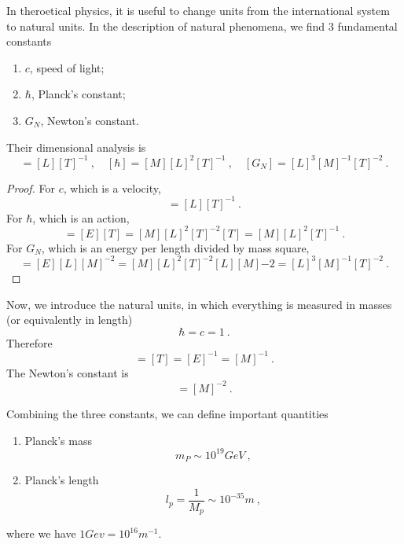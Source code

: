     In theroetical physics, it is useful to change units from the international system to natural units. In the description of natural phenomena, we find $3$ fundamental constants 
    \begin{enumerate}
        \item $c$, speed of light;
        \item $\hbar$, Planck's constant;
        \item $G_N$, Newton's constant.
    \end{enumerate}
    Their dimensional analysis is 
    \begin{equation*}
        [c] = [L][T]^{-1} ~, \quad [\hbar] = [M] [L]^2 [T]^{-1} ~, \quad [G_N] = [L]^3 [M]^{-1} [T]^{-2} ~.
    \end{equation*}
    \begin{proof}
        For $c$, which is a velocity,
        \begin{equation*}
            [c] = [L][T]^{-1} ~.
        \end{equation*}
        For $\hbar$, which is an action,
        \begin{equation*}
            [c] = [E][T] = [M] [L]^2 [T]^{-2} [T] = [M] [L]^2 [T]^{-1}  ~.
        \end{equation*}
        For $G_N$, which is an energy per length divided by mass square,
        \begin{equation*}
            [G_N] = [E] [L] [M]^{-2} = [M] [L]^2 [T]^{-2} [L] [M]{-2} = [L]^3 [M]^{-1} [T]^{-2} ~.
        \end{equation*}
    \end{proof}
    Now, we introduce the natural units, in which everything is measured in masses (or equivalently in length)
    \begin{equation*}
        \hbar = c = 1 ~.
    \end{equation*}
    Therefore 
    \begin{equation*}
        [L] = [T] = [E]^{-1} = [M]^{-1} ~.
    \end{equation*}
    The Newton's constant is 
    \begin{equation*}
        [G] = [M]^{-2} ~.
    \end{equation*}

    Combining the three constants, we can define important quantities
    \begin{enumerate}
        \item Planck's mass \begin{equation*}
            m_P \sim 10^{19} GeV ~,
        \end{equation*}
        \item Planck's length \begin{equation*}
            l_p = \frac{1}{M_p} \sim 10^{-35} m ~,
        \end{equation*}
    \end{enumerate}
    where we have $1 Gev = 10^{16} m^{-1}$.

